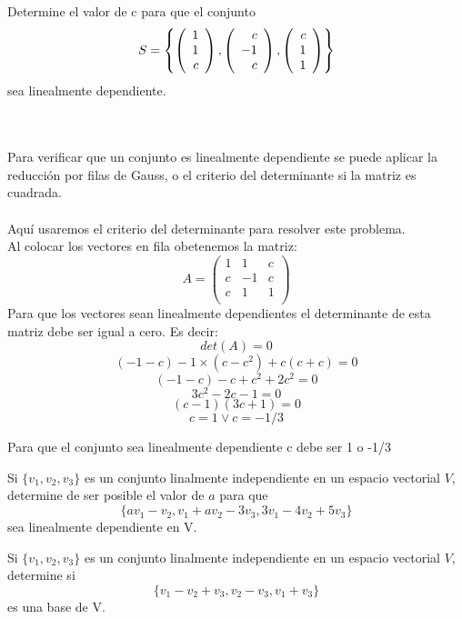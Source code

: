 \begin{enumerate}
\begin{prob}[]
\end{prob}


\begin{prop}[]

Determine el valor de c para que el conjunto $$S=\left\lbrace  \left( \begin{array}{r} 1\\ 1\\ c \end{array} \right) , \left( \begin{array}{r} c\\ -1\\ c \end{array} \right) , \left( \begin{array}{r} c\\ 1\\ 1 \end{array} \right) \right\rbrace $$ sea linealmente dependiente.
\end{prop}
~\\
\sol
~\\
Para verificar que un conjunto es linealmente dependiente se puede aplicar la reducción por filas de Gauss, o el criterio del determinante si la matriz es cuadrada.
~\\~\\
Aquí usaremos el criterio del determinante para resolver este problema.
~\\
Al colocar los vectores en fila obetenemos la matriz:
~\\
 $$A=\left(\begin{array}{rrr}
1&1&c\\
c&-1&c\\
c&1&1\\
\end{array}\right)$$
Para que los vectores sean linealmente dependientes el determinante de esta matriz debe ser igual a cero. Es decir:~\\
\[det(A)=0\]
\[(-1-c)-1\times(c-c^2)+c(c+c)=0\]
\[(-1-c)-c+c^2+2c^2=0\]
\[3c^2-2c-1=0\]
\[(c-1)(3c+1)=0\]
\[c=1 \vee c=-1/3\]

Para que el conjunto sea linealmente dependiente c debe ser 1 o -1/3


\begin{prob}[]

Si $\{v_1, v_2, v_3\} $ es un conjunto linalmente independiente en un espacio vectorial $V$, determine de ser posible el valor de $a$ para que $$\{av_1-v_2, v_1+av_2-3v_3, 3v_1 -4v_2+5v_3 \}$$ sea linealmente dependiente en V.
\end{prob}


\begin{prob}[]

Si $\{v_1, v_2, v_3\} $ es un conjunto linalmente independiente en un espacio vectorial $V$, determine si $$\{v_1-v_2+v_3, v_2-v_3, v_1 +v_3 \}$$ es una base de V.
\end{prob}


\end{enumerate}

